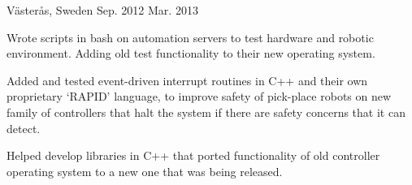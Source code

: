 \begin{cventries}
        {Västerås, Sweden}
        {Sep. 2012 \- Mar. 2013}
        {\begin{cvitems}
            \item{Wrote scripts in bash on automation servers to test hardware and robotic environment. Adding old test functionality to their new operating system.}
            \item{Added and tested event-driven interrupt routines in C++ and their own proprietary `RAPID' language, to improve safety of pick-place robots on new family of controllers that halt the system if there are safety concerns that it can detect.}
            \item{Helped develop libraries in C++ that ported functionality of old controller operating system to a new one that was being released.}
        \end{cvitems}}


\end{cventries}
